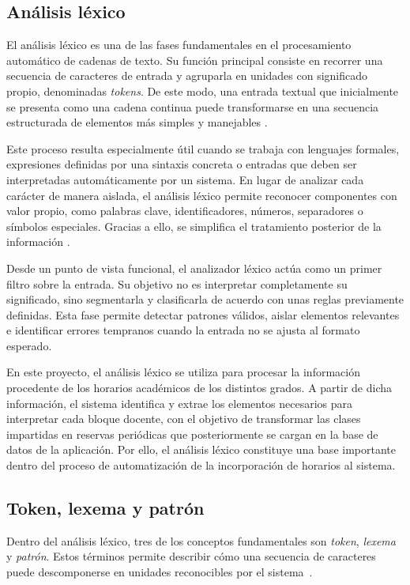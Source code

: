 \subsection{Análisis léxico}

El análisis léxico es una de las fases fundamentales en el procesamiento automático de cadenas de texto. Su función principal consiste en recorrer una secuencia de caracteres de entrada y agruparla en unidades con significado propio, denominadas \textit{tokens}. De este modo, una entrada textual que inicialmente se presenta como una cadena continua puede transformarse en una secuencia estructurada de elementos más simples y manejables \cite{uco:analizador}.

Este proceso resulta especialmente útil cuando se trabaja con lenguajes formales, expresiones definidas por una sintaxis concreta o entradas que deben ser interpretadas automáticamente por un sistema. En lugar de analizar cada carácter de manera aislada, el análisis léxico permite reconocer componentes con valor propio, como palabras clave, identificadores, números, separadores o símbolos especiales. Gracias a ello, se simplifica el tratamiento posterior de la información \cite{wiki:analizador}.

Desde un punto de vista funcional, el analizador léxico actúa como un primer filtro sobre la entrada. Su objetivo no es interpretar completamente su significado, sino segmentarla y clasificarla de acuerdo con unas reglas previamente definidas. Esta fase permite detectar patrones válidos, aislar elementos relevantes e identificar errores tempranos cuando la entrada no se ajusta al formato esperado.

En este proyecto, el análisis léxico se utiliza para procesar la información procedente de los horarios académicos de los distintos grados. A partir de dicha información, el sistema identifica y extrae los elementos necesarios para interpretar cada bloque docente, con el objetivo de transformar las clases impartidas en reservas periódicas que posteriormente se cargan en la base de datos de la aplicación. Por ello, el análisis léxico constituye una base importante dentro del proceso de automatización de la incorporación de horarios al sistema.


\subsection{Token, lexema y patrón}

Dentro del análisis léxico, tres de los conceptos fundamentales son \textit{token}, \textit{lexema} y \textit{patrón}. Estos términos permite describir cómo una secuencia de caracteres puede descomponerse en unidades reconocibles por el sistema~\cite{tok-lex-patr}.

